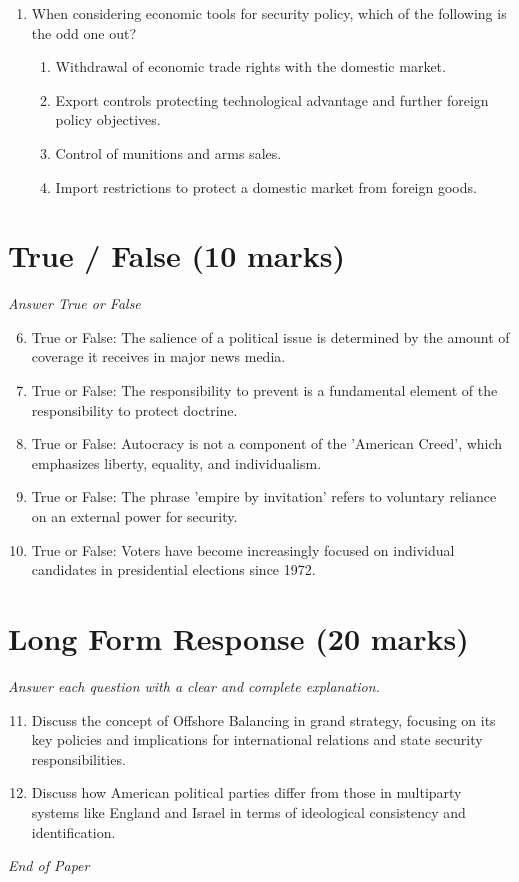\documentclass[12pt]{article}
\begin{document}
\begin{enumerate}[label=\arabic*.]
\begin{enumerate}[label=(\alph*)]
    \item It was designed as the antithesis of European politics
    \item It created a large standing army
    \item It encouraged the centralization of political power in the US
\end{enumerate}
\item When considering economic tools for security policy, which of the following is the odd one out?
\begin{enumerate}[label=(\alph*)]
    \item Withdrawal of economic trade rights with the domestic market.
    \item Export controls protecting technological advantage and further foreign policy objectives.
    \item Control of munitions and arms sales.
    \item Import restrictions to protect a domestic market from foreign goods.
\end{enumerate}
\end{enumerate}

\section*{True / False (10 marks)}
\textit{Answer True or False}
\begin{enumerate}[label=\arabic*.]
\setcounter{enumi}{5}
\item True or False: The salience of a political issue is determined by the amount of coverage it receives in major news media.
\item True or False: The responsibility to prevent is a fundamental element of the responsibility to protect doctrine.
\item True or False: Autocracy is not a component of the 'American Creed', which emphasizes liberty, equality, and individualism.
\item True or False: The phrase 'empire by invitation' refers to voluntary reliance on an external power for security.
\item True or False: Voters have become increasingly focused on individual candidates in presidential elections since 1972.
\end{enumerate}

\section*{Long Form Response (20 marks)}
\textit{Answer each question with a clear and complete explanation.}
\begin{enumerate}[label=\arabic*.]
\setcounter{enumi}{10}
\item Discuss the concept of Offshore Balancing in grand strategy, focusing on its key policies and implications for international relations and state security responsibilities.
\item Discuss how American political parties differ from those in multiparty systems like England and Israel in terms of ideological consistency and identification.
\end{enumerate}

\vfill
\noindent\textit{End of Paper}
\end{document}
